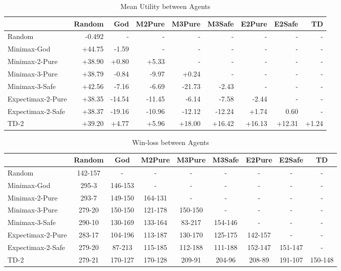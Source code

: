 \documentclass{article}
\begin{document}
\begin{table}[H]
\centering
\caption{Mean Utility between Agents}
\label{tab:result}
\begin{tabular}{lrrrrrrrr}
\hline
                  & Random & God    & M2Pure & M3Pure & M3Safe & E2Pure & E2Safe & TD    \\ \hline
Random            & -0.492 & -      & -      & -      & -      & -      & -      & -     \\
Minimax-God       & +44.75 & -1.59  & -      & -      & -      & -      & -      & -     \\
Minimax-2-Pure    & +38.90 & +0.80  & +5.33  & -      & -      & -      & -      & -     \\
Minimax-3-Pure    & +38.79 & -0.84  & -9.97  & +0.24  & -      & -      & -      & -     \\
Minimax-3-Safe    & +42.56 & -7.16  & -6.69  & -21.73 & -2.43  & -      & -      & -     \\
Expectimax-2-Pure & +38.35 & -14.54 & -11.45 & -6.14  & -7.58  & -2.44  & -      & -     \\
Expectimax-2-Safe & +38.37 & -19.16 & -10.96 & -12.12 & -12.24 & +1.74  & 0.60   & -     \\
TD-2              & +39.20 & +4.77  & +5.96  & +18.00 & +16.42 & +16.13 & +12.31 & +1.24 \\ \hline
\end{tabular}
\end{table}

\begin{table}[H]
\centering
\caption{Win-loss between Agents}
\label{tab:winloss}
\begin{tabular}{lcccccccc}
\hline
                  & Random  & God     & M2Pure  & M3Pure  & M3Safe  & E2Pure  & E2Safe  & TD      \\ \hline
Random            & 142-157 & -       & -       & -       & -       & -       & -       & -       \\
Minimax-God       & 295-3   & 146-153 & -       & -       & -       & -       & -       & -       \\
Minimax-2-Pure    & 293-7   & 149-150 & 164-131 & -       & -       & -       & -       & -       \\
Minimax-3-Pure    & 279-20  & 150-150 & 121-178 & 150-150 & -       & -       & -       & -       \\
Minimax-3-Safe    & 290-10  & 130-169 & 133-164 & 83-217  & 154-146 & -       & -       & -       \\
Expectimax-2-Pure & 283-17  & 104-196 & 113-187 & 130-170 & 125-175 & 142-157 & -       & -       \\
Expectimax-2-Safe & 279-20  & 87-213  & 115-185 & 112-188 & 111-188 & 152-147 & 151-147 & -       \\
TD-2              & 279-21  & 170-127 & 170-128 & 209-91  & 204-96  & 208-89  & 191-107 & 150-148 \\ \hline
\end{tabular}
\end{table}
\end{document}
